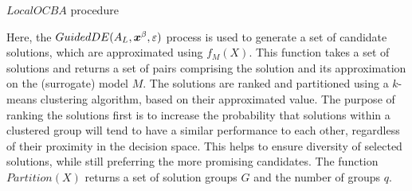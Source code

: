 \begin{algorithm}[h!] 
\caption{$LocalOCBA$ procedure}
\label{alg:local-ocba}
{\footnotesize
\begin{algorithmic}[1]
 
 
 
 
\label{while-loop}
   
   
   
   
   
\ENDWHILE
{} 
\end{algorithmic}
}
\end{algorithm}

Here, the $GuidedDE(A_L,\boldsymbol{x}^\beta,\varepsilon)$ process is used to generate a set of candidate solutions, which are approximated using $f_M(X)$. This function takes a set of solutions and returns a set of pairs comprising the solution and its approximation on the (surrogate) model $M$. The solutions are ranked and partitioned using a $k$-means clustering algorithm, based on their approximated value. The purpose of ranking the solutions first is to increase the probability that solutions within a clustered group will tend to have a similar performance to each other, regardless of their proximity in the decision space. This helps to ensure diversity of selected solutions, while still preferring the more promising candidates. The function $Partition(X)$ returns a set of solution groups $G$ and the number of groups $q$.

